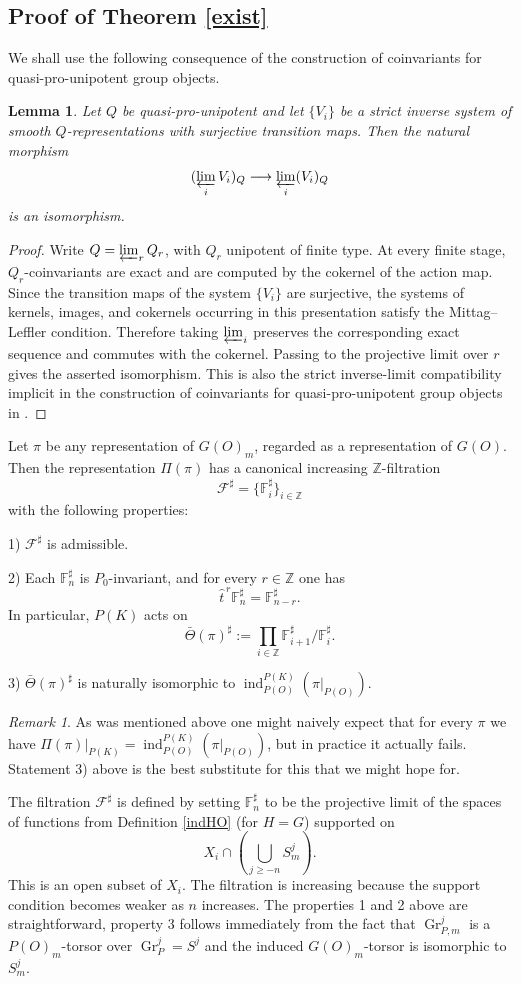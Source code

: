 \documentclass[11pt,a4paper,twoside]{amsart}
\newtheorem{lemma}[theorem]{Lemma}
\theoremstyle{definition}
\theoremstyle{remark}
\newtheorem{remark}[theorem]{Remark}
\newcommand{\mF}{\mathbb F}
\newcommand{\mcF}{\mathcal F}
\newcommand{\ZZ}{\mathbb Z}
\newcommand{\ind}{\operatorname{ind}}
\newcommand{\Gr}{\operatorname{Gr}}
\begin{document}
\subsection{Proof of Theorem \ref{exist}}
We shall use the following consequence of the construction of coinvariants for quasi-pro-unipotent group objects.
\begin{lemma}\label{strict-limit-coinvariants}
Let $Q$ be quasi-pro-unipotent and let $\{V_i\}$ be a strict inverse system of smooth $Q$-representations with surjective transition maps. Then the natural morphism
$$
(\varprojlim_iV_i)_Q\longrightarrow\varprojlim_i(V_i)_Q
$$
is an isomorphism.
\end{lemma}
\begin{proof}
Write $Q=\varprojlim_rQ_r$, with $Q_r$ unipotent of finite type. At every finite stage, $Q_r$-coinvariants are exact and are computed by the cokernel of the action map. Since the transition maps of the system $\{V_i\}$ are surjective, the systems of kernels, images, and cokernels occurring in this presentation satisfy the Mittag--Leffler condition. Therefore taking $\varprojlim_i$ preserves the corresponding exact sequence and commutes with the cokernel. Passing to the projective limit over $r$ gives the asserted isomorphism. This is also the strict inverse-limit compatibility implicit in the construction of coinvariants for quasi-pro-unipotent group objects in \cite[Proposition~2.7]{GK1}.
\end{proof}
Let $\pi$ be any representation of $G(O)_m$, regarded as a representation of $G(O)$. Then the representation $\Pi(\pi)$ has a canonical increasing $\ZZ$-filtration
$$
\mcF^\sharp=\{\mF_i^\sharp\}_{i\in\ZZ}
$$
with the following properties:

1) $\mcF^\sharp$ is admissible.

2) Each $\mF_n^\sharp$ is $P_0$-invariant, and for every $r\in\ZZ$ one has
$$
\widehat t^{\,r}\mF_n^\sharp=\mF_{n-r}^\sharp.
$$
In particular, $P(K)$ acts on
$$
\bar\Theta(\pi)^\sharp:=\prod_{i\in\ZZ}\mF_{i+1}^\sharp/\mF_i^\sharp.
$$

3) $\bar\Theta(\pi)^\sharp$ is naturally isomorphic to $\ind_{P(O)}^{P(K)}(\pi|_{P(O)})$.

\begin{remark}\label{ass-gr}
As was mentioned above one might naively expect that for every $\pi$ we have $\Pi(\pi)|_{P(K)}=\ind_{P(O)}^{P(K)}(\pi|_{P(O)})$, but in practice it actually fails. Statement 3) above is the best substitute for this that we might hope for.
\end{remark}
The filtration $\mcF^\sharp$ is defined by setting $\mF_n^\sharp$ to be the projective limit of the spaces of functions from Definition \ref{indHO} (for $H=G$) supported on
$$
X_i\cap\left(\bigcup_{j\geq -n}S_m^j\right).
$$
This is an open subset of $X_i$. The filtration is increasing because the support condition becomes weaker as $n$ increases.
The properties 1 and 2 above are straightforward, property 3 follows immediately from the fact that $\Gr_{P,m}^j$ is a $P(O)_m$-torsor over $\Gr_P^j=S^j$ and the induced $G(O)_m$-torsor is isomorphic to $S^j_m$.
\end{document}
